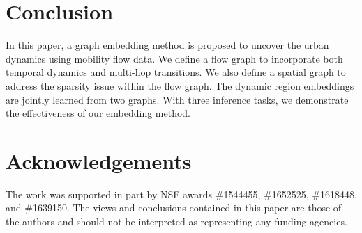 \section{Conclusion}
\label{ch3-sec:conclusion}

In this paper, a graph embedding method is proposed to uncover the urban dynamics using mobility flow data. We define a flow graph to incorporate both temporal dynamics and multi-hop transitions. We also define a spatial graph to address the sparsity issue within the flow graph.  The dynamic region embeddings are jointly learned from two graphs. With three inference tasks, we demonstrate the effectiveness of our embedding method.


\section*{Acknowledgements}
The work was supported in part by NSF awards \#1544455, \#1652525, \#1618448,  and \#1639150. The views and conclusions contained in this paper are those of the authors and should not be interpreted as representing any funding agencies.